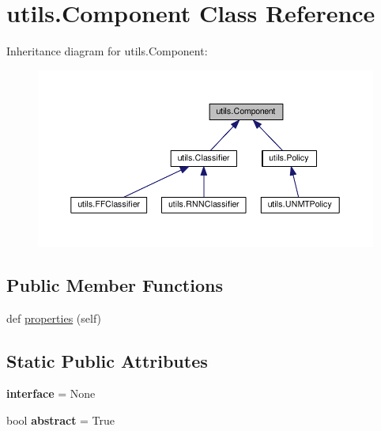 \hypertarget{classutils_1_1Component}{}\section{utils.\+Component Class Reference}
\label{classutils_1_1Component}


Inheritance diagram for utils.\+Component\+:
\nopagebreak
\begin{figure}[H]
\begin{center}
\leavevmode
\includegraphics[width=350pt]{classutils_1_1Component__inherit__graph}
\end{center}
\end{figure}
\subsection*{Public Member Functions}
\begin{DoxyCompactItemize}
\item 
def \hyperlink{classutils_1_1Component_a09cbf7ace9815dc5e5595a35d5912f63}{properties} (self)
\end{DoxyCompactItemize}
\subsection*{Static Public Attributes}
\begin{DoxyCompactItemize}
\item 
{\bfseries interface} = None\hypertarget{classutils_1_1Component_a2329a886ae5a082efb0118b3e938249b}{}\label{classutils_1_1Component_a2329a886ae5a082efb0118b3e938249b}

\item 
bool {\bfseries abstract} = True\hypertarget{classutils_1_1Component_abb9cba8b93872c7cd890f49a0cda4619}{}\label{classutils_1_1Component_abb9cba8b93872c7cd890f49a0cda4619}

\end{DoxyCompactItemize}


